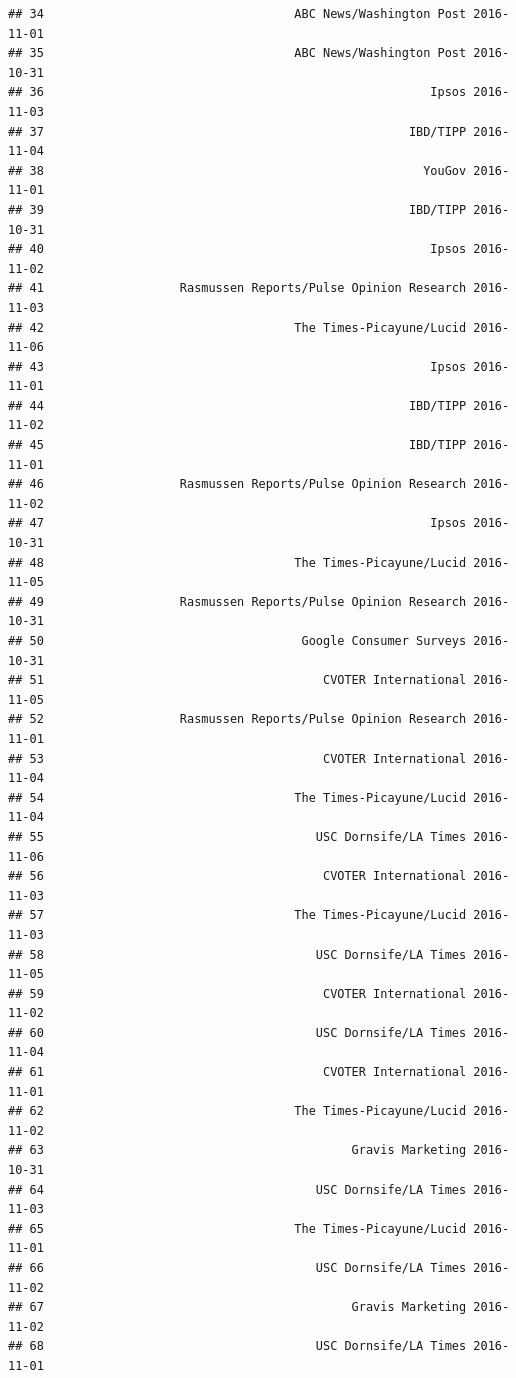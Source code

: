\documentclass[
]{article}
\begin{document}
\begin{verbatim}
## 34                                   ABC News/Washington Post 2016-11-01
## 35                                   ABC News/Washington Post 2016-10-31
## 36                                                      Ipsos 2016-11-03
## 37                                                   IBD/TIPP 2016-11-04
## 38                                                     YouGov 2016-11-01
## 39                                                   IBD/TIPP 2016-10-31
## 40                                                      Ipsos 2016-11-02
## 41                   Rasmussen Reports/Pulse Opinion Research 2016-11-03
## 42                                   The Times-Picayune/Lucid 2016-11-06
## 43                                                      Ipsos 2016-11-01
## 44                                                   IBD/TIPP 2016-11-02
## 45                                                   IBD/TIPP 2016-11-01
## 46                   Rasmussen Reports/Pulse Opinion Research 2016-11-02
## 47                                                      Ipsos 2016-10-31
## 48                                   The Times-Picayune/Lucid 2016-11-05
## 49                   Rasmussen Reports/Pulse Opinion Research 2016-10-31
## 50                                    Google Consumer Surveys 2016-10-31
## 51                                       CVOTER International 2016-11-05
## 52                   Rasmussen Reports/Pulse Opinion Research 2016-11-01
## 53                                       CVOTER International 2016-11-04
## 54                                   The Times-Picayune/Lucid 2016-11-04
## 55                                      USC Dornsife/LA Times 2016-11-06
## 56                                       CVOTER International 2016-11-03
## 57                                   The Times-Picayune/Lucid 2016-11-03
## 58                                      USC Dornsife/LA Times 2016-11-05
## 59                                       CVOTER International 2016-11-02
## 60                                      USC Dornsife/LA Times 2016-11-04
## 61                                       CVOTER International 2016-11-01
## 62                                   The Times-Picayune/Lucid 2016-11-02
## 63                                           Gravis Marketing 2016-10-31
## 64                                      USC Dornsife/LA Times 2016-11-03
## 65                                   The Times-Picayune/Lucid 2016-11-01
## 66                                      USC Dornsife/LA Times 2016-11-02
## 67                                           Gravis Marketing 2016-11-02
## 68                                      USC Dornsife/LA Times 2016-11-01

\end{verbatim}
\end{document}
